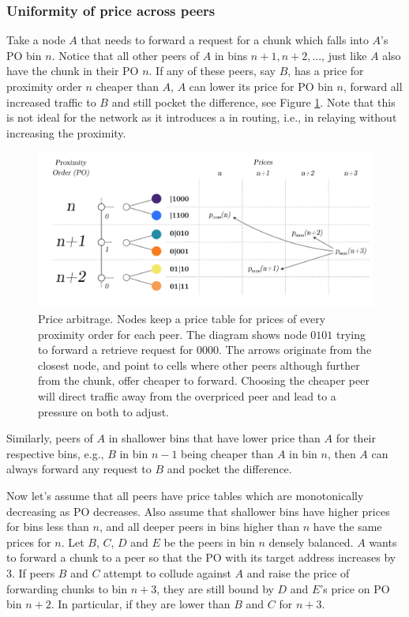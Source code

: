 \subsubsection{Uniformity of price across peers}

Take a node $A$ that needs to forward a request for a chunk which falls into $A$'s PO bin $n$. Notice that all other peers of $A$ in bins $n+1, n+2, ...$, just like $A$ also have the chunk in their PO $n$. If any of these peers, say $B$, has a price  for proximity order $n$ cheaper than $A$, $A$ can lower its price for PO bin $n$, forward all increased traffic to $B$ and still pocket the difference, see Figure  \ref{fig:price-arbitrage}. Note that this is not ideal for the network as it introduces a  in routing, i.e., in relaying without increasing the proximity. 


\begin{figure}[htbp]
   \centering
   \includegraphics[width=\textwidth]{fig/price-arbitrage-3.pdf}
    \caption[Price arbitrage \statusgreen]{Price arbitrage. Nodes keep a price table for prices of every proximity order for each peer. The diagram shows node $0101$ trying to forward a retrieve request for $0000$. The arrows originate from the closest node, and point to cells where other peers although further from the chunk, offer cheaper to forward. Choosing the cheaper peer will direct traffic away from the overpriced peer and lead to a pressure on both to adjust.}
   \label{fig:price-arbitrage}
\end{figure}
 


Similarly, peers of $A$ in shallower bins that have lower price than $A$ for their respective bins, e.g., $B$ in bin $n-1$ being cheaper than $A$ in bin $n$, then $A$ can always forward any request to $B$ and pocket the difference.

Now let's assume that all peers have price tables which are monotonically decreasing as PO decreases. Also assume that shallower bins have higher prices for bins less than $n$, and all deeper peers in bins higher than $n$ have the same prices for $n$. Let $B$, $C$, $D$ and $E$ be the peers in bin $n$ densely balanced. $A$ wants to  forward a chunk to a peer so that the PO with its target address increases by 3. If peers $B$ and $C$ attempt to collude against $A$ and raise the price of forwarding chunks to bin $n+3$, they are still bound by $D$ and $E$'s price on PO bin $n+2$. In particular, if they are lower than $B$ and $C$ for $n+3$.

